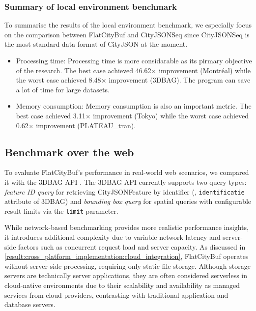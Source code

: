
\subsubsection{Summary of local environment benchmark}
\label{result:benchmark_on_local_environment:summary}
To summarise the results of the local environment benchmark, we especially focus on the comparison between FlatCityBuf and CityJSONSeq since CityJSONSeq is the most standard data format of CityJSON at the moment.

\begin{itemize}
  \item Processing time: Processing time is more considarable as its pirmary objective of the research. The best case achieved 46.62$\times$ improvement (Montréal) while the worst case achieved 8.48$\times$ improvement (3DBAG). The program can save a lot of time for large datasets.
  \item Memory consumption: Memory consumption is also an important metric. The best case achieved 3.11$\times$ improvement (Tokyo) while the worst case achieved 0.62$\times$ improvement (PLATEAU\_tran).
\end{itemize}

\subsection{Benchmark over the web}
\label{result:benchmark_over_the_web}

To evaluate FlatCityBuf's performance in real-world web scenarios, we compared it with the 3DBAG API \citep{3dbag_api}. The 3DBAG API currently supports two query types: \textit{feature ID query} for retrieving CityJSONFeature by identifier (\eg, \texttt{identificatie} attribute of 3DBAG) and \textit{bounding box query} for spatial queries with configurable result limits via the \texttt{limit} parameter.

While network-based benchmarking provides more realistic performance insights, it introduces additional complexity due to variable network latency and server-side factors such as concurrent request load and server capacity. As discussed in \autoref{result:cross_platform_implementation:cloud_integration}, FlatCityBuf operates without server-side processing, requiring only static file storage. Although storage servers are technically server applications, they are often considered serverless in cloud-native environments due to their scalability and availability as managed services from cloud providers, contrasting with traditional application and database servers.

